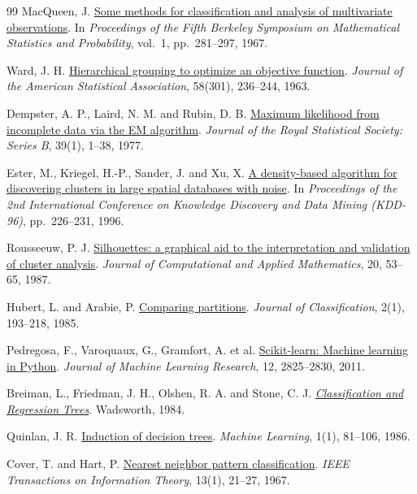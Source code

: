 \begin{thebibliography}{99}
MacQueen, J.
\href{https://projecteuclid.org/euclid.bsmsp/1200512992}{Some methods for classification and analysis of multivariate observations}.
In \textit{Proceedings of the Fifth Berkeley Symposium on Mathematical Statistics and Probability}, vol.~1, pp.~281--297, 1967.

Ward, J. H.
\href{https://doi.org/10.1080/01621459.1963.10500845}{Hierarchical grouping to optimize an objective function}.
\textit{Journal of the American Statistical Association}, 58(301), 236--244, 1963.

Dempster, A. P., Laird, N. M. and Rubin, D. B.
\href{https://doi.org/10.1111/j.2517-6161.1977.tb01600.x}{Maximum likelihood from incomplete data via the EM algorithm}.
\textit{Journal of the Royal Statistical Society: Series B}, 39(1), 1--38, 1977.

Ester, M., Kriegel, H.-P., Sander, J. and Xu, X.
\href{https://cdn.aaai.org/KDD/1996/KDD96-037.pdf}{A density-based algorithm for discovering clusters in large spatial databases with noise}.
In \textit{Proceedings of the 2nd International Conference on Knowledge Discovery and Data Mining (KDD-96)}, pp.~226--231, 1996.

Rousseeuw, P. J.
\href{https://doi.org/10.1016/0377-0427(87)90125-7}{Silhouettes: a graphical aid to the interpretation and validation of cluster analysis}.
\textit{Journal of Computational and Applied Mathematics}, 20, 53--65, 1987.

Hubert, L. and Arabie, P.
\href{https://doi.org/10.1007/BF01908075}{Comparing partitions}.
\textit{Journal of Classification}, 2(1), 193--218, 1985.

Pedregosa, F., Varoquaux, G., Gramfort, A. et al.
\href{https://jmlr.org/papers/v12/pedregosa11a.html}{Scikit-learn: Machine learning in Python}.
\textit{Journal of Machine Learning Research}, 12, 2825--2830, 2011.

Breiman, L., Friedman, J. H., Olshen, R. A. and Stone, C. J.
\href{https://doi.org/10.1201/9781315139470}{\textit{Classification and Regression Trees}}.
Wadsworth, 1984.

Quinlan, J. R.
\href{https://doi.org/10.1023/A:1022643204877}{Induction of decision trees}.
\textit{Machine Learning}, 1(1), 81--106, 1986.

Cover, T. and Hart, P.
\href{https://doi.org/10.1109/TIT.1967.1053964}{Nearest neighbor pattern classification}.
\textit{IEEE Transactions on Information Theory}, 13(1), 21--27, 1967.


\end{thebibliography}
